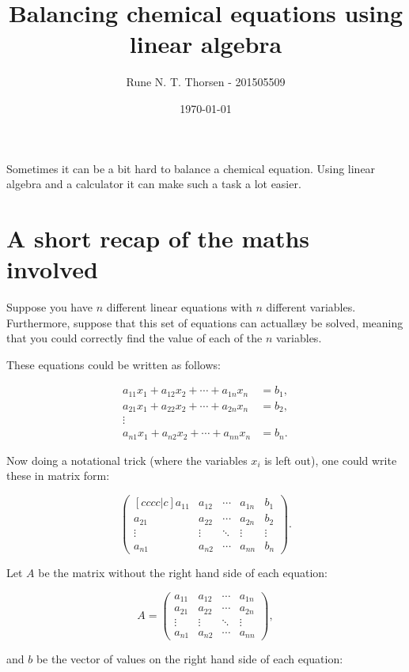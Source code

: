 \documentclass[a4paper]{article}
\title{Balancing chemical equations using linear algebra} %
\author{Rune N. T. Thorsen - 201505509} %
\date{\today} %
\begin{document}
\maketitle

Sometimes it can be a bit hard to balance a chemical equation. Using linear algebra and a calculator it can make such a task a lot easier.

\section{A short recap of the maths involved}

Suppose you have $n$ different linear equations with $n$ different variables. Furthermore, suppose that this set of equations can actuallæy be solved, meaning that you could correctly find the value of each of the $n$ variables.

These equations could be written as follows:

\begin{align*}
	a_{11} x_1 + a_{12} x_2 + \cdots + a_{1n} x_n &= b_1,\\
	a_{21} x_1 + a_{22} x_2 + \cdots + a_{2n} x_n &= b_2,\\
	\vdots\\
	a_{n1} x_1 + a_{n2} x_2 + \cdots + a_{nn} x_n &= b_n.
\end{align*}

Now doing a notational trick (where the variables $x_{i}$ is left out), one could write these in matrix form:

$$
\begin{pmatrix}[cccc|c]
	a_{11} & a_{12} & \cdots & a_{1n} & b_1\\
	a_{21} & a_{22} & \cdots & a_{2n} & b_2\\
	\vdots & \vdots & \ddots & \vdots & \vdots\\
	a_{n1} & a_{n2} & \cdots & a_{nn} & b_n
\end{pmatrix}.
$$

Let $A$ be the matrix without the right hand side of each equation:

$$A =
\begin{pmatrix}
	a_{11} & a_{12} & \cdots & a_{1n}\\
	a_{21} & a_{22} & \cdots & a_{2n}\\
	\vdots & \vdots & \ddots & \vdots\\
	a_{n1} & a_{n2} & \cdots & a_{nn}
\end{pmatrix},
$$

\noindent and $b$ be the vector of values on the right hand side of each equation:
\end{document}
